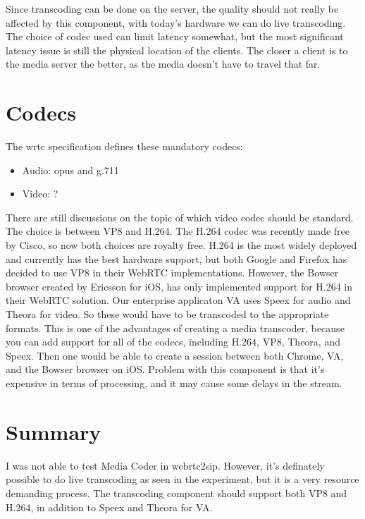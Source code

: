 Since transcoding can be done on the server, the quality should not really be affected by this component, with today's hardware we can do live transcoding. The choice of codec used can limit latency somewhat, but the most significant latency issue is still the physical location of the clients. The closer a client is to the media server the better, as the media doesn't have to travel that far.

\section{Codecs}

The \gls{wrtc} specification defines these mandatory codecs:
\begin{itemize}
    \item Audio: opus and g.711
    \item Video: ?
\end{itemize}

There are still discussions on the topic of which video codec should be standard. The choice is between VP8 and H.264. The H.264 codec was recently made free by Cisco\cite{h264-free}, so now both choices are royalty free. H.264 is the most widely deployed and currently has the best hardware support, but both Google and Firefox has decided to use VP8 in their WebRTC implementations. However, the Bowser browser created by Ericsson for iOS, has only implemented support for H.264 in their WebRTC solution. Our enterprise applicaton VA uses Speex for audio and Theora for video. So these would have to be transcoded to the appropriate formats. This is one of the advantages of creating a media transcoder, because you can add support for all of the codecs, including H.264, VP8, Theora, and Speex. Then one would be able to create a session between both Chrome, VA, and the Bowser browser on iOS. Problem with this component is that it's expensive in terms of processing, and it may cause some delays in the stream.

\section{Summary}
I was not able to test Media Coder in webrtc2sip. However, it's definately possible to do live transcoding as seen in the experiment, but it is a very resource demanding process. The transcoding component should support both VP8 and H.264, in addition to Speex and Theora for VA.